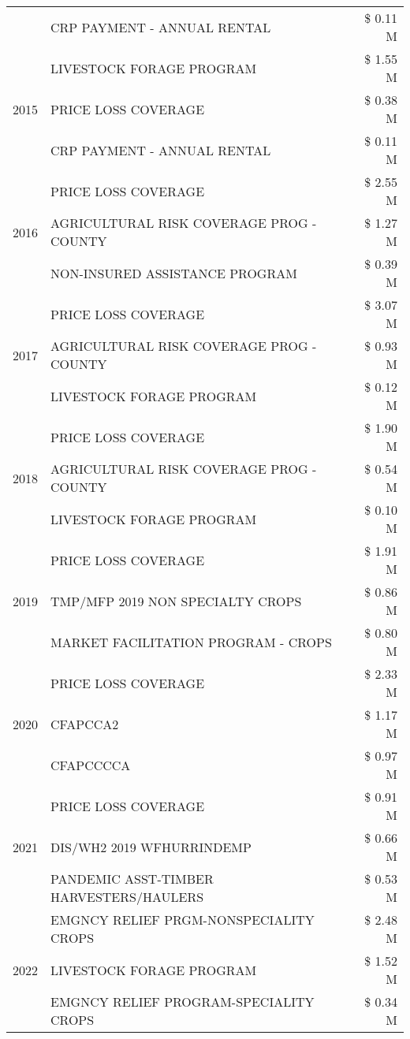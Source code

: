 \begin{tabular}{llr}
 & CRP PAYMENT - ANNUAL RENTAL & \$ 0.11 M \\
\cline{1-3}
\multirow[t]{3}{*}{2015} & LIVESTOCK FORAGE PROGRAM & \$ 1.55 M \\
 & PRICE LOSS COVERAGE & \$ 0.38 M \\
 & CRP PAYMENT - ANNUAL RENTAL & \$ 0.11 M \\
\cline{1-3}
\multirow[t]{3}{*}{2016} & PRICE LOSS COVERAGE & \$ 2.55 M \\
 & AGRICULTURAL RISK COVERAGE PROG - COUNTY & \$ 1.27 M \\
 & NON-INSURED ASSISTANCE PROGRAM & \$ 0.39 M \\
\cline{1-3}
\multirow[t]{3}{*}{2017} & PRICE LOSS COVERAGE & \$ 3.07 M \\
 & AGRICULTURAL RISK COVERAGE PROG - COUNTY & \$ 0.93 M \\
 & LIVESTOCK FORAGE PROGRAM & \$ 0.12 M \\
\cline{1-3}
\multirow[t]{3}{*}{2018} & PRICE LOSS COVERAGE & \$ 1.90 M \\
 & AGRICULTURAL RISK COVERAGE PROG - COUNTY & \$ 0.54 M \\
 & LIVESTOCK FORAGE PROGRAM & \$ 0.10 M \\
\cline{1-3}
\multirow[t]{3}{*}{2019} & PRICE LOSS COVERAGE & \$ 1.91 M \\
 & TMP/MFP 2019 NON SPECIALTY CROPS & \$ 0.86 M \\
 & MARKET FACILITATION PROGRAM - CROPS & \$ 0.80 M \\
\cline{1-3}
\multirow[t]{3}{*}{2020} & PRICE LOSS COVERAGE & \$ 2.33 M \\
 & CFAPCCA2 & \$ 1.17 M \\
 & CFAPCCCCA & \$ 0.97 M \\
\cline{1-3}
\multirow[t]{3}{*}{2021} & PRICE LOSS COVERAGE & \$ 0.91 M \\
 & DIS/WH2 2019 WFHURRINDEMP & \$ 0.66 M \\
 & PANDEMIC ASST-TIMBER HARVESTERS/HAULERS & \$ 0.53 M \\
\cline{1-3}
\multirow[t]{3}{*}{2022} & EMGNCY RELIEF PRGM-NONSPECIALITY CROPS & \$ 2.48 M \\
 & LIVESTOCK FORAGE PROGRAM & \$ 1.52 M \\
 & EMGNCY RELIEF PROGRAM-SPECIALITY CROPS & \$ 0.34 M \\
\cline{1-3}
\bottomrule
\end{tabular}
